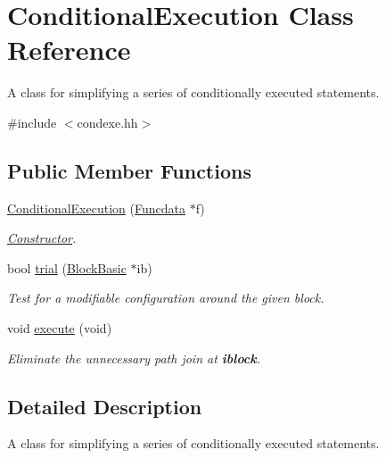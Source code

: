 \hypertarget{class_conditional_execution}{}\section{Conditional\+Execution Class Reference}
\label{class_conditional_execution}


A class for simplifying a series of conditionally executed statements.  




{\ttfamily \#include $<$condexe.\+hh$>$}

\subsection*{Public Member Functions}
\begin{DoxyCompactItemize}
\item 
\mbox{\hyperlink{class_conditional_execution_a8070a0147522c29ebcce9ff781a53575}{Conditional\+Execution}} (\mbox{\hyperlink{class_funcdata}{Funcdata}} $\ast$f)
\begin{DoxyCompactList}\small\item\em \mbox{\hyperlink{class_constructor}{Constructor}}. \end{DoxyCompactList}\item 
bool \mbox{\hyperlink{class_conditional_execution_abf756d499c20aba093c6f3d4214cb4a5}{trial}} (\mbox{\hyperlink{class_block_basic}{Block\+Basic}} $\ast$ib)
\begin{DoxyCompactList}\small\item\em Test for a modifiable configuration around the given block. \end{DoxyCompactList}\item 
void \mbox{\hyperlink{class_conditional_execution_afc3956000baa5c9338bdb728ba3034b3}{execute}} (void)
\begin{DoxyCompactList}\small\item\em Eliminate the unnecessary path join at {\bfseries{iblock}}. \end{DoxyCompactList}\end{DoxyCompactItemize}


\subsection{Detailed Description}
A class for simplifying a series of conditionally executed statements. 

